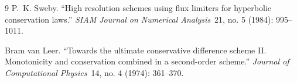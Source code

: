 \documentclass[CHICAGO]{USG}
\begin{document}
\begin{thebibliography}{9}
P.~K. Sweby.
\newblock ``High resolution schemes using flux limiters for hyperbolic
 conservation laws.'' {\it SIAM Journal on Numerical Analysis\/}~21, no. 5
 (1984): 995--1011. 

Bram van Leer.
\newblock ``Towards the ultimate conservative difference scheme {II}.
 {M}onotonicity and conservation combined in a second-order scheme.'' {\it
 Journal of Computational Physics\/}~14, no. 4 (1974): 361--370. 

\end{thebibliography}
\end{document}
